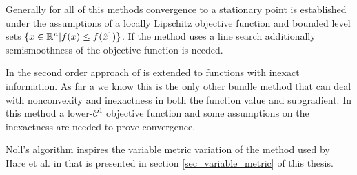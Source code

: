 Generally for all of this methods convergence to a stationary point is established under the assumptions of a locally Lipschitz objective function and bounded level sets \(\{x \in \mathbb{R}^n | f(x) \leq f(\hat{x}^1)\}\).
If the method uses a line search additionally semismoothness of the objective function is needed.

In \cite{Noll2013} the second order approach of \cite{Noll2012} is extended to functions with inexact information.
As far a we know this is the only other bundle method that can deal with nonconvexity and inexactness in both the function value and subgradient. In this method a lower-\(\mathcal{C}^1\) objective function and some assumptions on the inexactness are needed to prove convergence.

Noll's algorithm inspires the variable metric variation of the method used by Hare et al. in \cite{Hare2016} that is presented in section \ref{sec_variable_metric} of this thesis.


